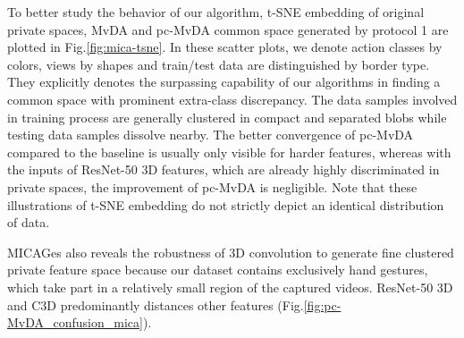     To better study the behavior of our algorithm, t-SNE embedding of original private spaces, MvDA and pc-MvDA common space generated by protocol 1 are plotted in Fig.\ref{fig:mica-tsne}. In these scatter plots, we denote action classes by colors, views by shapes and train/test data are distinguished by border type. They explicitly denotes the surpassing capability of our algorithms in finding a common space with prominent extra-class discrepancy. The data samples involved in training process are generally clustered in compact and separated blobs while testing data samples dissolve nearby. The better convergence of pc-MvDA compared to the baseline is usually only visible for harder features, whereas with the inputs of ResNet-50 3D features, which are already highly discriminated in private spaces, the improvement of pc-MvDA is negligible. Note that these illustrations of t-SNE embedding do not strictly depict an identical distribution of data.

    MICAGes also reveals the robustness of 3D convolution to generate fine clustered private feature space because our dataset contains exclusively hand gestures, which take part in a relatively small region of the captured videos. ResNet-50 3D and C3D predominantly distances other features (Fig.\ref{fig:pc-MvDA_confusion_mica}).

